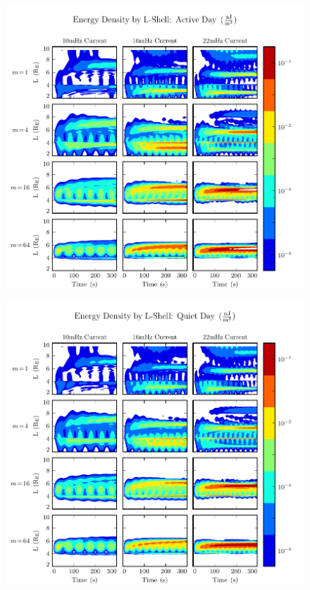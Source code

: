 \begin{figure}[H]
    \centering
    \includegraphics[width=\textwidth]{figures/ulayers_J_1.pdf}
    \caption[Energy Density by L-Shell: Active Day]{}
    \label{fig_ulayers_J_1}
\end{figure}

\begin{figure}[H]
    \centering
    \includegraphics[width=\textwidth]{figures/ulayers_J_2.pdf}
    \caption[Energy Density by L-Shell: Quiet Day]{}
    \label{fig_ulayers_J_2}
\end{figure}

